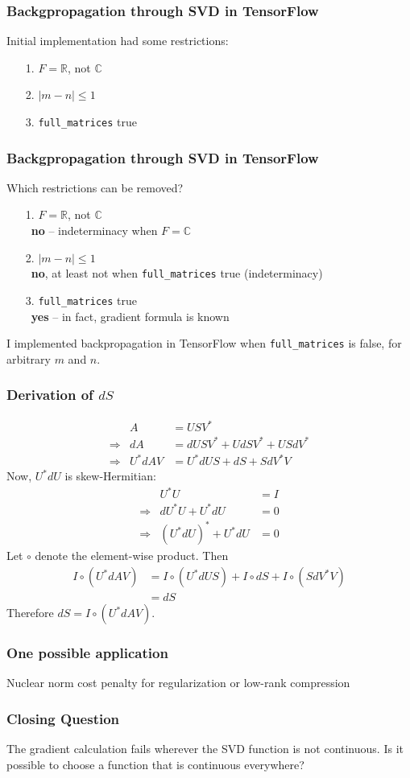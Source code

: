 \documentclass{beamer}
\begin{document}
\begin{frame}
  \frametitle{Backgpropagation through SVD in TensorFlow}
  Initial implementation had some restrictions:
  \begin{itemize}
  \item[1.] $F = \mathbb{R}$, not $\mathbb{C}$
  \item[2.] $|m - n| \leq 1$
  \item[3.] \texttt{full\_matrices} true
  \end{itemize}
\end{frame}
\begin{frame}
  \frametitle{Backgpropagation through SVD in TensorFlow}
  Which restrictions can be removed?
  \begin{itemize}
  \item[1.] $F = \mathbb{R}$, not $\mathbb{C}$ \\
    \ \textbf{no} -- indeterminacy when $F = \mathbb{C}$
  \item[2.] $|m - n| \leq 1$ \\
    \ \textbf{no}, at least not when \texttt{full\_matrices} true (indeterminacy)
  \item[3.] \texttt{full\_matrices} true \\
    \ \textbf{yes} -- in fact, gradient formula is known
  \end{itemize}
  \vspace{0.5cm}
  I implemented backpropagation in TensorFlow when \texttt{full\_matrices} is false, for arbitrary $m$ and $n$.
\end{frame}
\begin{frame}
  \frametitle{Derivation of $dS$}
  \[\begin{array}{rrl}
  & A & = USV^* \\
  \Rightarrow & dA & = dUSV^* + UdSV^* + USdV^* \\
  \Rightarrow & U^*dAV & = U^*dUS + dS + SdV^*V
  \end{array}\]
  Now, $U^*dU$ is skew-Hermitian:
  \[\begin{array}{rrl}
  & U^*U & = I \\
  \Rightarrow & dU^*U + U^*dU & = 0 \\
  \Rightarrow & (U^*dU)^* + U^*dU & = 0
  \end{array}\]
  Let $\circ$ denote the element-wise product.  Then
  \[\begin{array}{rl}
  I \circ (U^*dAV) & = I \circ (U^*dUS) + I \circ dS + I \circ (SdV^*V) \\
  & = dS
  \end{array}\]
  Therefore $\boxed{dS = I \circ (U^*dAV)}$.
\end{frame}
\begin{frame}
  \frametitle{One possible application}
  Nuclear norm cost penalty for regularization or low-rank compression
\end{frame}
\begin{frame}
\frametitle{Closing Question}
The gradient calculation fails wherever the SVD function is not continuous.  Is it possible to choose a function that is continuous everywhere?
\end{frame}
\end{document}
